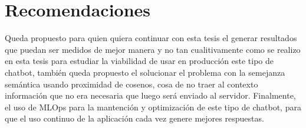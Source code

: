 \chapter{Recomendaciones}

\par Queda propuesto para quien quiera continuar con esta tesis el generar resultados
que puedan ser medidos de mejor manera y no tan cualitivamente como se realizo en esta tesis para
estudiar la viabilidad de 
usar en producción este tipo de chatbot, también queda propuesto el solucionar el problema 
con la semejanza semántica usando proximidad de cosenos, cosa de no traer al contexto información que no 
era necesaria que luego será enviado al servidor. Finalmente, el uso de MLOps para la mantención y optimización de este tipo de chatbot, para 
que el uso continuo de la aplicación cada vez genere mejores respuestas.